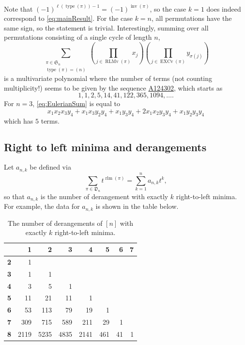 \documentclass[reqno]{amsart}
\theoremstyle{definition}
\newcommand{\oeis}[1]{\href{http://oeis.org/#1}{#1}}
\newcommand{\symS}{\mathfrak{S}}
\newcommand{\dArr}{\mathfrak{D}}
\DeclareMathOperator{\inv}{inv}
\DeclareMathOperator{\type}{type}
\DeclareMathOperator{\length}{\ell}
\DeclareMathOperator{\EXCv}{EXCv}
\DeclareMathOperator{\rlm}{rlm}
\DeclareMathOperator{\RLMv}{RLMv}
\begin{document}
Note that $(-1)^{\length(\type(\pi))-1} = (-1)^{\inv(\pi)}$,
so the case $k=1$ does indeed correspond to \cref{eq:mainResult}.
For the case $k=n$, all permutations have the same sign, so the statement is trivial.
Interestingly, summing over all permutations consisting of a single cycle of length $n$,
\begin{equation}\label{eq:EulerianSum}
 \sum_{\substack{\pi \in \symS_n \\ \type(\pi) = (n)}}
 \left(\prod_{j\in \RLMv(\pi)} x_j \right)
 \left(\prod_{j\in \EXCv(\pi)} y_{\sigma(j)} \right)
\end{equation}
is a multivariate polynomial where the number of terms (not counting multiplicity!)
seems to be given by the sequence \oeis{A124302}, which starts as
\[
 1, 1, 2, 5, 14, 41, 122, 365, 1094, \dotsc.
\]
For $n=3$, \eqref{eq:EulerianSum} is equal to
\[
 x_1 x_2 x_3 y_4 + 
 x_1 x_3 y_2 y_4 + 
 x_1 y_3 y_4 + 
 2 x_1 x_2 y_3 y_4 +
 x_1 y_2 y_3 y_4
\]
which has $5$ terms.


\subsection{Right to left minima and derangements}

Let $a_{n,k}$ be defined via
\begin{equation}
 \sum_{\pi \in \dArr_n} t^{\rlm(\pi)} = \sum_{k=1}^n a_{n,k} t^k,
\end{equation}
so that $a_{n,k}$ is the number of derangement with exactly $k$ right-to-left minima.
For example, the data for $a_{n,k}$ is shown in the table below.

\begin{table}[!ht]
\begin{tabular}{rrrrrrrr}
 & \textbf{1} & \textbf{2} & \textbf{3} & \textbf{4}& \textbf{5}& \textbf{6}& \textbf{7} \\
\toprule
\textbf{2}& 1 \\
\textbf{3}&1 & 1\\
\textbf{4}&3 & 5 & 1 \\
\textbf{5}&11 & 21 & 11 & 1 \\
\textbf{6}&53 & 113 & 79 & 19 & 1 \\
\textbf{7}&309 & 715 & 589 & 211 & 29 & 1  \\
\textbf{8}&2119 & 5235 & 4835 & 2141 & 461 & 41 & 1 \\
\end{tabular}
\caption{The number of derangements of $[n]$ with exactly $k$ right-to-left minima.}\label{tab:deArrRLM}
\end{table}
\end{document}
